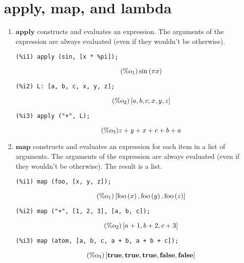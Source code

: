 \documentclass[12pt,leqno]{article}
\begin{document}
\section{apply, map, and lambda}

\begin{enumerate}

\item $\mathbf{apply}$ constructs and evaluates an expression.
The arguments of the expression are always evaluated (even if they wouldn't be otherwise).
\begin{verbatim}
(%i1) apply (sin, [x * %pi]);
\end{verbatim}
\begin{equation}
\tag{$\mathop{\mathrm{\%o}_{1}}$}\sin \left(\pi x\right)
\label{eq:doc-group1-code23-1-1}
\end{equation}
\begin{verbatim}
(%i2) L: [a, b, c, x, y, z];
\end{verbatim}
\begin{equation}
\tag{$\mathop{\mathrm{\%o}_{2}}$}\left[a, b, c, x, y, z\right]
\label{eq:doc-group1-code23-2-1}
\end{equation}
\begin{verbatim}
(%i3) apply ("+", L);
\end{verbatim}
\begin{equation}
\tag{$\mathop{\mathrm{\%o}_{3}}$}z+y+x+c+b+a
\label{eq:doc-group1-code23-3-1}
\end{equation}


\item $\mathbf{map}$ constructs and evaluates an expression for each item in a list of arguments.
The arguments of the expression are always evaluated (even if they wouldn't be otherwise).
The result is a list.
\begin{verbatim}
(%i1) map (foo, [x, y, z]);
\end{verbatim}
\begin{equation}
\tag{$\mathop{\mathrm{\%o}_{1}}$}\left[\mathop{\mathrm{foo}}\left(x\right), \mathop{\mathrm{foo}}\left(y\right), \mathop{\mathrm{foo}}\left(z\right)\right]
\label{eq:doc-group1-code24-1-1}
\end{equation}
\begin{verbatim}
(%i2) map ("+", [1, 2, 3], [a, b, c]);
\end{verbatim}
\begin{equation}
\tag{$\mathop{\mathrm{\%o}_{2}}$}\left[a+1, b+2, c+3\right]
\label{eq:doc-group1-code24-2-1}
\end{equation}
\begin{verbatim}
(%i3) map (atom, [a, b, c, a + b, a + b + c]);
\end{verbatim}
\begin{equation}
\tag{$\mathop{\mathrm{\%o}_{3}}$}\left[\mathop{\mathbf{true}}, \mathop{\mathbf{true}}, \mathop{\mathbf{true}}, \mathop{\mathbf{false}}, \mathop{\mathbf{false}}\right]
\label{eq:doc-group1-code24-3-1}
\end{equation}



\end{enumerate}
\end{document}
